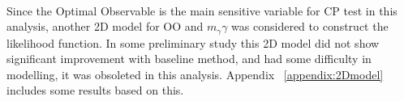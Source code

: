 \paragraph{} Since the Optimal Observable is the main sensitive variable for CP test in this analysis, another 2D model for OO and $m_\gamma\gamma$ was considered to construct the likelihood function. In some preliminary study this 2D model did not show significant improvement with baseline method, and had some difficulty in modelling, it was obsoleted in this analysis. Appendix ~\ref{appendix:2Dmodel} includes some results based on this. 


